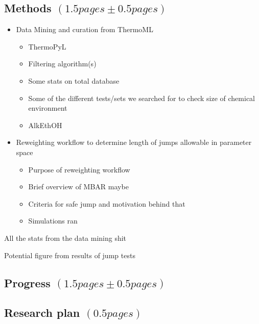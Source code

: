 \documentclass[rmp,nofootinbib,superscriptaddress,12pt,tightenlines,notitlepage]{revtex4-1}
\begin{document}
\subsection{Methods $\left(1.5 pages \pm 0.5 pages\right)$}
\begin{itemize}
 \item Data Mining and curation from ThermoML
  \begin{itemize}
   \item ThermoPyL
   \item Filtering algorithm(s)
   \item Some stats on total database
   \item Some of the different tests/sets we searched for to check size of chemical environment
   \item AlkEthOH
  \end{itemize}
 \item Reweighting workflow to determine length of jumps allowable in parameter space
  \begin{itemize}
   \item Purpose of reweighting workflow
   \item Brief overview of MBAR maybe
   \item Criteria for safe jump and motivation behind that
   \item Simulations ran
  \end{itemize}
\end{itemize}  
All the stats from the data mining shit

Potential figure from results of jump tests



\subsection{Progress $\left(1.5 pages \pm 0.5 pages\right)$}

\subsection{Research plan $\left(0.5 pages\right)$}



\end{document}
